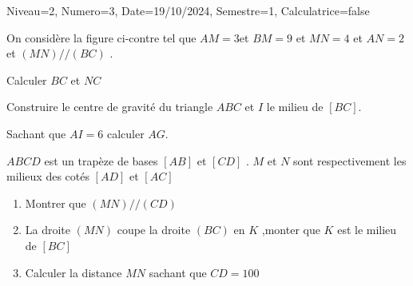 \documentclass[a4paper,12pt]{article}
\begin{document}
\begin{Maquette}[DS]{Niveau=2, Numero=3, Date=19/10/2024, Semestre=1, Calculatrice=false}
\begin{exercice}
On considère la figure ci-contre tel que $AM=3$\newline et $BM=9$ et $MN=4$ et $AN=2$ et $(MN)//(BC)$ . 
\begin{enumerate}
\begin{minipage}{0.6\linewidth}
\item{} Calculer $BC$ et $NC$
\anserline[4]
\item{} Construire le centre de gravité du triangle $ABC$ et $I$ le milieu de $[BC]$.
\end{minipage}
\begin{minipage}{0.4\linewidth}
\end{minipage}
\item{} Sachant que  $AI=6$ calculer $AG$.
\end{enumerate}
\anserline[2]
\end{exercice}

\begin{exercice}
$ABCD$ est un trapèze de bases $[AB]$ et $[CD]$ . $M$ et $N$ sont respectivement les milieux des cotés $[AD]$ et $[AC]$ 
\begin{enumerate}
\item{} Montrer que $(MN)//(CD)$\newline
\anserline[3]
\item{} La droite $(MN)$ coupe la droite $(BC)$ en $K$ ,monter que $K$ est le milieu de $[BC]$\newline
\anserline[3]
\item{} Calculer la distance $MN$ sachant que $CD=100$\newline
\anserline[3]
\end{enumerate}
\end{exercice}
\end{Maquette}
\end{document}
